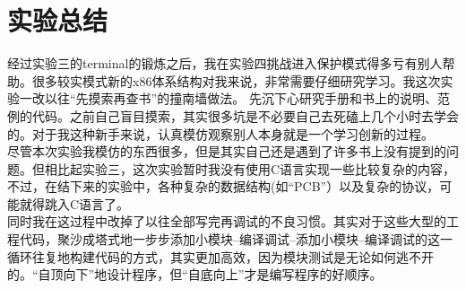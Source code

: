 \documentclass[a4paper,11pt,UTF8]{ctexart}
\begin{document}
\section{实验总结}
经过实验三的terminal的锻炼之后，我在实验四挑战进入保护模式得多亏有别人帮助。很多较实模式新的x86体系结构对我来说，非常需要仔细研究学习。我这次实验一改以往“先摸索再查书”的撞南墙做法。
先沉下心研究手册和书上的说明、范例的代码。之前自己盲目摸索，其实很多坑是不必要自己去死磕上几个小时去学会的。对于我这种新手来说，认真模仿观察别人本身就是一个学习创新的过程。\\
\indent 尽管本次实验我模仿的东西很多，但是其实自己还是遇到了许多书上没有提到的问题。但相比起实验三，这次实验暂时我没有使用C语言实现一些比较复杂的内容，不过，在结下来的实验中，各种复杂的数据结构(如“PCB”）以及复杂的协议，可能就得跳入C语言了。\\
\indent 同时我在这过程中改掉了以往全部写完再调试的不良习惯。其实对于这些大型的工程代码，聚沙成塔式地一步步添加小模块--编译调试--添加小模块--编译调试的这一循环往复地构建代码的方式，其实更加高效，因为模块测试是无论如何逃不开的。“自顶向下”地设计程序，但“自底向上”才是编写程序的好顺序。



\clearpage
\end{document}
